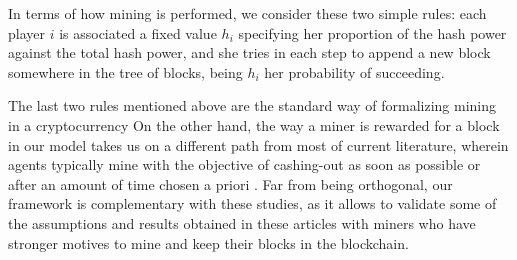 \documentclass[a4paper,english,cleveref, autoref,numberwithinsect]{lipics-v2019}
\begin{document}
%
%
In terms of how mining is performed, we consider these two simple rules: each player $i$ is associated
a fixed value $h_i$ specifying her proportion of the hash power 
against the total hash power, and  
she tries in each step to append a new block somewhere in the tree of blocks, being 
$h_i$ her probability of succeeding. 

The last two rules mentioned above 
are the standard way of 
formalizing mining in a cryptocurrency 
On the other hand, the way a miner is rewarded for a block in our model
takes us on a different path from most of current literature, wherein agents typically mine 
with the objective of cashing-out as soon as possible or after an amount of time chosen a priori   \cite{mininggames:2016,biais2018blockchain}. Far from being orthogonal, our framework is complementary with these studies, as it allows to validate some of the assumptions and results obtained in these articles with miners who have stronger motives to mine and keep their blocks in the blockchain.
\end{document}
